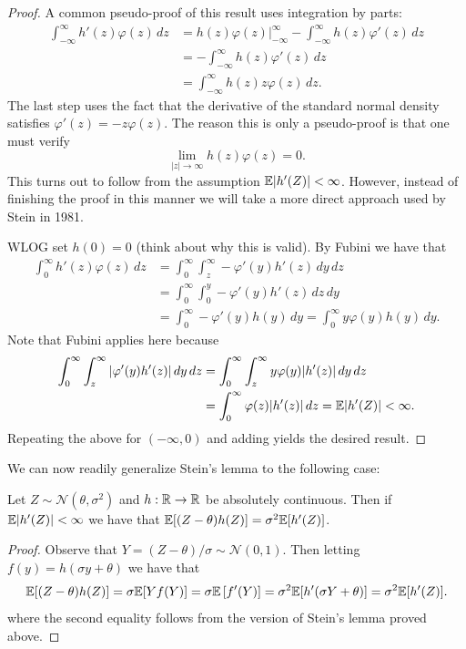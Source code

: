 \begin{proof} 
	 A common pseudo-proof of this result uses integration by parts:
	\begin{align*}
	\int_{-\infty}^{\infty}h'(z)\varphi(z)\,dz
	&=
	h(z)\varphi(z)\Big|_{-\infty}^{\infty}
	-
	\int_{-\infty}^{\infty}h(z)\varphi'(z)\,dz \\
	&=-\int_{-\infty}^{\infty}h(z)\varphi'(z)\,dz \\
	&=\int_{-\infty}^{\infty}h(z)z\varphi(z)\,dz.
	\end{align*}
	The last step uses the fact that the derivative of the standard normal density satisfies $\varphi'(z) = -z\varphi(z)$. The reason this is only a pseudo-proof is that one must verify
	\[
	\lim_{|z|\to\infty}h(z)\varphi(z)=0.
	\]
	This turns out to follow from the assumption $\mathbb{E}|h'(Z)| < \infty$. However, instead of finishing the proof in this manner we will take a more direct approach used by Stein in 1981.
	
	\medskip \noindent WLOG set $h(0) = 0$ (think about why this is valid). By Fubini we have that \begin{align*}
	\int_{0}^{\infty} h'(z) \varphi(z) \,dz &=  \int_{0}^{\infty} \int_{z}^{\infty} -\varphi'(y)h'(z) \,dy \,dz \\
	&= \int_{0}^{\infty} \int_{0}^{y} -\varphi'(y)h'(z) \,dz  \,dy \\
	&=  \int_{0}^{\infty} -\varphi'(y) h(y) \,dy = \int_{0}^{\infty} y \varphi(y) h(y) \,dy.
	\end{align*} Note that Fubini applies here because 
	\begin{align*}
	\int_0^\infty\int_z^\infty
	|\varphi'(y)h'(z)|\,dy\,dz
	&=
	\int_0^\infty\int_z^\infty
	y\varphi(y)|h'(z)|\,dy\,dz \\
	&=
	\int_0^\infty\varphi(z)|h'(z)|\,dz = \mathbb{E}|h'(Z)|<\infty.
	\end{align*}
	Repeating the above for $(-\infty, 0)$ and adding yields the desired result.
\end{proof}

\noindent We can now readily generalize Stein's lemma to the following case:

\begin{lemma}[Stein]
	Let $Z \sim \mathcal{N}(\theta,\sigma^2)$ and $h : \mathbb{R} \to \mathbb{R}$ be absolutely continuous. Then if $\mathbb{E}|h'(Z)| < \infty$ we have that $\mathbb{E}[(Z-\theta) h(Z)] = \sigma^2 \mathbb{E}[h'(Z)]$.
\end{lemma}

\begin{proof}
	Observe that $Y = (Z - \theta) / \sigma \sim \mathcal{N}(0, 1)$. Then letting $f(y) = h(\sigma y + \theta)$ we have that \[
		\mathbb{E}[(Z-\theta) h(Z)] = \sigma \mathbb{E}[Y f(Y)] = \sigma \mathbb{E}\left[f'(Y) \right] = \sigma^2 \mathbb{E}[h'(\sigma Y + \theta)] = \sigma^2 \mathbb{E}[h'(Z)].
	\] where the second equality follows from the version of Stein's lemma proved above.
\end{proof}


